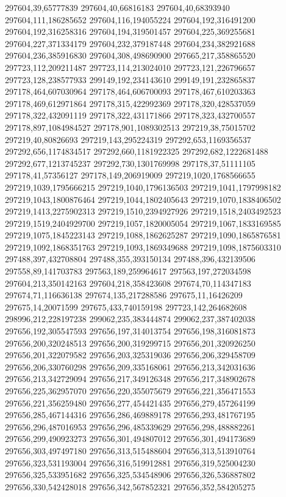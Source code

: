 297604,39,65777839
297604,40,66816183
297604,40,68393940
297604,111,186285652
297604,116,194055224
297604,192,316491200
297604,192,316258316
297604,194,319501457
297604,225,369255681
297604,227,371334179
297604,232,379187448
297604,234,382921688
297604,236,385916830
297604,308,498690900
297665,217,358865520
297723,112,209211487
297723,114,213024010
297723,121,226796657
297723,128,238577933
299149,192,234143610
299149,191,232865837
297178,464,607030964
297178,464,606700093
297178,467,610203363
297178,469,612971864
297178,315,422992369
297178,320,428537059
297178,322,432091119
297178,322,431171866
297178,323,432700557
297178,897,1084984527
297178,901,1089302513
297219,38,75015702
297219,40,80826693
297219,143,295224319
297292,653,1169356537
297292,656,1174834517
297292,660,1181922325
297292,682,1222681488
297292,677,1213745237
297292,730,1301769998
297178,37,51111105
297178,41,57356127
297178,149,206919009
297219,1020,1768566655
297219,1039,1795666215
297219,1040,1796136503
297219,1041,1797998182
297219,1043,1800876464
297219,1044,1802405643
297219,1070,1838406502
297219,1413,2275902313
297219,1510,2394927926
297219,1518,2403492523
297219,1519,2404929700
297219,1057,1820005054
297219,1067,1833169585
297219,1075,1845223143
297219,1088,1862625287
297219,1090,1865876581
297219,1092,1868351763
297219,1093,1869349688
297219,1098,1875603310
297488,397,432708804
297488,355,393150134
297488,396,432139506
297558,89,141703783
297563,189,259964617
297563,197,272034598
297604,213,350142163
297604,218,358423608
297674,70,114347183
297674,71,116636138
297674,135,217288586
297675,11,16426209
297675,14,20071599
297675,433,740159198
297723,142,264682608
298996,212,228197238
299062,235,383444874
299062,237,387402038
297656,192,305547593
297656,197,314013754
297656,198,316081873
297656,200,320248513
297656,200,319299715
297656,201,320926250
297656,201,322079582
297656,203,325319036
297656,206,329458709
297656,206,330760298
297656,209,335168061
297656,213,342031636
297656,213,342729094
297656,217,349126348
297656,217,348902678
297656,225,362957070
297656,220,355075679
297656,221,356471553
297656,221,356259480
297656,277,454421435
297656,279,457264199
297656,285,467144316
297656,286,469889178
297656,293,481767195
297656,296,487016953
297656,296,485339629
297656,298,488882261
297656,299,490923273
297656,301,494807012
297656,301,494173689
297656,303,497497180
297656,313,515488604
297656,313,513910764
297656,323,531193004
297656,316,519912881
297656,319,525004230
297656,325,533951682
297656,325,534548906
297656,326,536887802
297656,330,542428018
297656,342,567852321
297656,352,584205275
